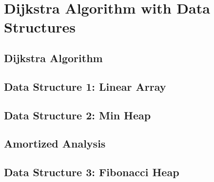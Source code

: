 \chapter{Dijkstra Algorithm with Data Structures}

\section{Dijkstra Algorithm}

\section{Data Structure 1: Linear Array}

\section{Data Structure 2: Min Heap}

\section{Amortized Analysis}

\section{Data Structure 3: Fibonacci Heap}